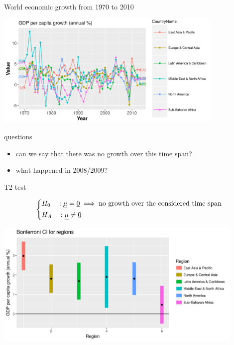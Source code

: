 \documentclass[9pt]{beamer}
\begin{document}
\begin{frame}{World economic growth from 1970 to 2010}
	\begin{block}{}
		\includegraphics[height=5.5cm]{growth.png}
	\end{block}
	\begin{block}{questions}
		\begin{itemize}
			\item can we say that there was no growth over this time span?
			\item what happened in 2008/2009?
		\end{itemize}
	\end{block}
\end{frame}

\begin{frame}{T2 test}
		\begin{block}{} %
			\[
			\begin{dcases}
				H_{0} \quad : \underline{\mu} = \underline{0} \implies  \text{no growth over the considered time span} \\
				H_{A} \quad : \underline{\mu} \ne \underline{0}
			\end{dcases}
			\]	
		\end{block}
		\begin{block}{} %
			\includegraphics[height=6cm]{CI.png}
		\end{block}
\end{frame}
\end{document}
